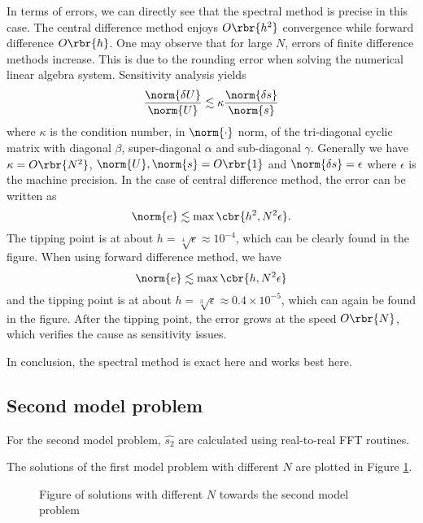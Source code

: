 \documentclass[english, nochinese]{pnote}
\begin{document}
In terms of errors, we can directly see that the spectral method is precise in this case. The central difference method enjoys $ O \rbr{h^2} $ convergence while forward difference $ O \rbr{h} $. One may observe that for large $N$, errors of finite difference methods increase. This is due to the rounding error when solving the numerical linear algebra system. Sensitivity analysis yields
\begin{equation}
\frac{\norm{ \delta U }}{\norm{U}} \lesssim \kappa \frac{\norm{ \delta s }}{\norm{s}}
\end{equation}
where $\kappa$ is the condition number, in $\norm{\cdot}$ norm, of the tri-diagonal cyclic matrix with diagonal $\beta$, super-diagonal $\alpha$ and sub-diagonal $\gamma$. Generally we have $ \kappa = O \rbr{N^2} $, $ \norm{U}, \norm{s} = O \rbr{1} $ and $ \norm{ \delta s } = \epsilon $ where $\epsilon$ is the machine precision. In the case of central difference method, the error can be written as
\begin{equation}
\norm{e} \lesssim \max \cbr{ h^2, N^2 \epsilon }.
\end{equation}
The tipping point is at about $ h = \sqrt[4]{\epsilon} \approx 10^{-4} $, which can be clearly found in the figure. When using forward difference method, we have
\begin{equation}
\norm{e} \lesssim \max \cbr{ h, N^2 \epsilon }
\end{equation}
and the tipping point is at about $ h = \sqrt[3]{\epsilon} \approx 0.4 \times 10^{-5} $, which can again be found in the figure. After the tipping point, the error grows at the speed $ O \rbr{N} $, which verifies the cause as sensitivity issues.

In conclusion, the spectral method is exact here and works best here.

\subsection{Second model problem}

For the second model problem, $\hat{s_2}$ are calculated using real-to-real FFT routines.

The solutions of the first model problem with different $N$ are plotted in Figure \ref{Fig:SecondFig}.

\begin{figure}[htbp]
\centering
\scalebox{0.75}{}
\caption{Figure of solutions with different $N$ towards the second model problem}
\label{Fig:SecondFig}
\end{figure}
\end{document}
